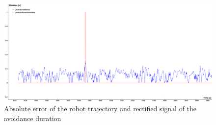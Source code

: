 \begin{figure} 
	\includegraphics[width=\textwidth]{Pictures/final analysis no obstacle}
	\caption{Absolute error of the robot trajectory and rectified signal of the avoidance duration}
	\label{noobserr}
\end{figure}

